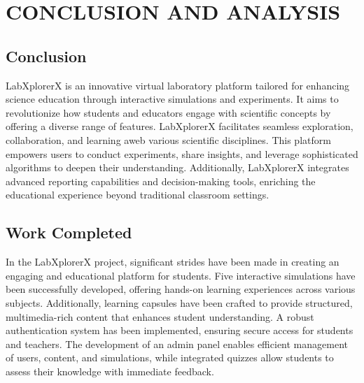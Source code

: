 \chapter{CONCLUSION AND ANALYSIS}
\section{Conclusion}
LabXplorerX is an innovative virtual laboratory platform tailored for enhancing science education through interactive simulations and experiments. It aims to revolutionize how students and educators engage with scientific concepts by offering a diverse range of features. LabXplorerX facilitates seamless exploration, collaboration, and learning aweb various scientific disciplines. This platform empowers users to conduct experiments, share insights, and leverage sophisticated algorithms to deepen their understanding. Additionally, LabXplorerX integrates advanced reporting capabilities and decision-making tools, enriching the educational experience beyond traditional classroom settings.
\section{Work Completed}
In the LabXplorerX project, significant strides have been made in creating an engaging and educational platform for students. Five interactive simulations have been successfully developed, offering hands-on learning experiences across various subjects. Additionally, learning capsules have been crafted to provide structured, multimedia-rich content that enhances student understanding. A robust authentication system has been implemented, ensuring secure access for students and teachers. The development of an admin panel enables efficient management of users, content, and simulations, while integrated quizzes allow students to assess their knowledge with immediate feedback.

